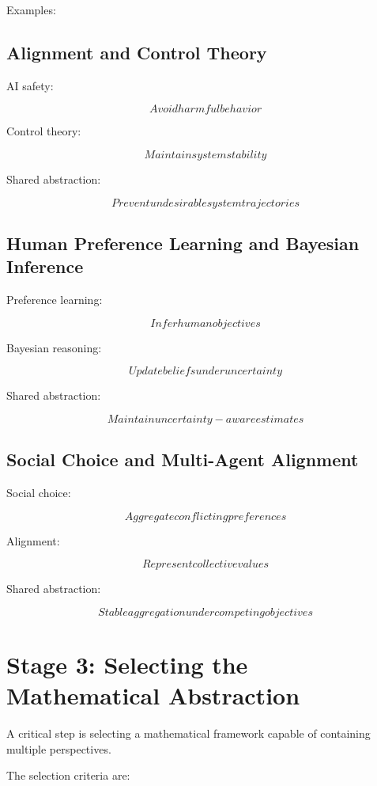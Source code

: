\documentclass[11pt]{article}
\begin{document}
Examples:


\subsection{Alignment and Control Theory}


AI safety:

\[
Avoid harmful behavior
\]


Control theory:

\[
Maintain system stability
\]


Shared abstraction:


\[
Prevent undesirable system trajectories
\]



\subsection{Human Preference Learning and Bayesian Inference}


Preference learning:


\[
Infer human objectives
\]


Bayesian reasoning:


\[
Update beliefs under uncertainty
\]


Shared abstraction:


\[
Maintain uncertainty-aware estimates
\]



\subsection{Social Choice and Multi-Agent Alignment}


Social choice:


\[
Aggregate conflicting preferences
\]


Alignment:


\[
Represent collective values
\]


Shared abstraction:


\[
Stable aggregation under competing objectives
\]



\section{Stage 3: Selecting the Mathematical Abstraction}


A critical step is selecting a mathematical framework capable of
containing multiple perspectives.


The selection criteria are:
\end{document}
